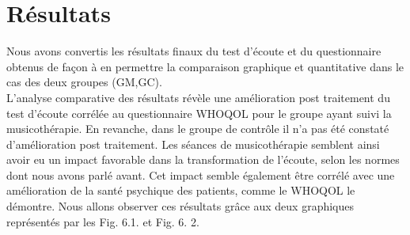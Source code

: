   
   \chapter{Résultats}
   Nous avons convertis les résultats finaux du test d'écoute et du questionnaire obtenus de façon à en 
   permettre la comparaison graphique et quantitative dans le cas des deux groupes (GM,GC).
   \\
   L'analyse comparative des résultats révèle une amélioration post traitement 
   du test d'écoute corrélée au questionnaire WHOQOL pour le groupe ayant suivi la musicothérapie. En 
   revanche, dans le groupe de contrôle il n'a pas été constaté d'amélioration post traitement. Les 
   séances de  
   musicothérapie semblent  ainsi avoir 
   eu un impact favorable dans la transformation de l'écoute, selon les normes dont nous avons parlé 
   avant. Cet impact semble également être corrélé avec une amélioration de la santé psychique des 
   patients, comme le WHOQOL le démontre. Nous allons observer ces résultats grâce aux deux 
   graphiques représentés par  les Fig. 6.1. et Fig. 6. 2.
 
